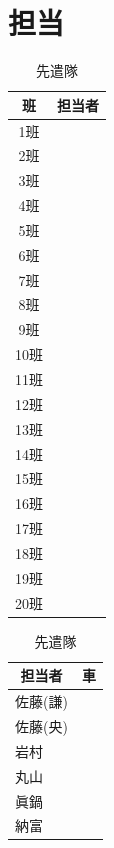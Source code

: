 \section{担当}
\begin{table}[h]
  \centering
  \begin{minipage}[t]{0.25\columnwidth}
    \centering
    \caption{班付き}
    \begin{tabular}{cc}
      \hline
      班 & 担当者 \\
      \hline
      1班 &  \\
      2班 &  \\
      3班 &  \\
      4班 &  \\
      5班 &  \\
      6班 &  \\
      7班 &  \\
      8班 &  \\
      9班 &  \\
      10班 &  \\
      11班 &  \\
      12班 &  \\
      13班 &  \\
      14班 &  \\
      15班 &  \\
      16班 &  \\
      17班 &  \\
      18班 &  \\
      19班 &  \\
      20班 &  \\
      \hline
    \end{tabular}
  \end{minipage}
  \begin{minipage}[t]{0.66\columnwidth}
    \begin{minipage}[t]{0.49\columnwidth}
      \centering
      \caption{先遣隊}
      \begin{tabular}{ll}
        \hline
        \multicolumn{1}{c}{担当者} & \multicolumn{1}{c}{車} \\
        \hline
        佐藤(謙) & \\
        佐藤(央) & \\
        岩村 & \\
        丸山 & \\
        眞鍋 & \\
        納富 & \\
        \hline
      \end{tabular}

\end{minipage}
\end{minipage}
\end{table}
